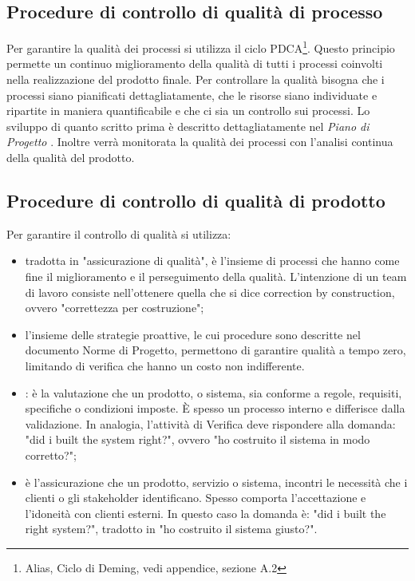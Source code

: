 \subsection{Procedure di controllo di qualità di processo} %
\label{2.2}
Per garantire la qualità dei processi si utilizza il ciclo PDCA\footnote{Alias, Ciclo di Deming, vedi appendice, sezione A.2}.  Questo principio permette un continuo miglioramento della qualità di tutti i processi coinvolti nella realizzazione del prodotto finale.
Per controllare la qualità bisogna che i processi siano pianificati dettagliatamente, che le risorse siano individuate e ripartite in maniera quantificabile e che ci sia un controllo sui processi. Lo sviluppo di quanto scritto prima è descritto dettagliatamente nel \emph{Piano di Progetto \versionePianoDiProgetto{}}.
Inoltre verrà monitorata la qualità dei processi con l'analisi continua della qualità del prodotto.


\subsection{Procedure di controllo di qualità di prodotto} %
\label{2.3}
Per garantire il controllo di qualità si utilizza:
\begin{itemize}
\item {} tradotta in "assicurazione di qualità", è l'insieme di processi che hanno come fine il miglioramento e il perseguimento della qualità. L'intenzione di un team di lavoro consiste nell'ottenere quella che si dice correction by construction, ovvero "correttezza per costruzione";
\item {} l'insieme delle strategie proattive, le cui procedure sono descritte nel documento Norme di Progetto, permettono di garantire qualità a tempo zero, limitando  di verifica che hanno un costo non indifferente.
\item {}: è la valutazione che un prodotto,  o sistema, sia conforme a regole, requisiti, specifiche o condizioni imposte. È spesso un processo interno e differisce dalla validazione. In analogia, l'attività di Verifica deve rispondere alla domanda: "did i built the system right?", ovvero "ho costruito il sistema in modo corretto?";
\item {} è l'assicurazione che un prodotto, servizio o sistema, incontri le necessità che i clienti o gli stakeholder identificano. Spesso comporta l'accettazione e l'idoneità con clienti esterni. In questo caso la domanda è: "did i built the right system?", tradotto in "ho costruito il sistema giusto?".
\end{itemize}







